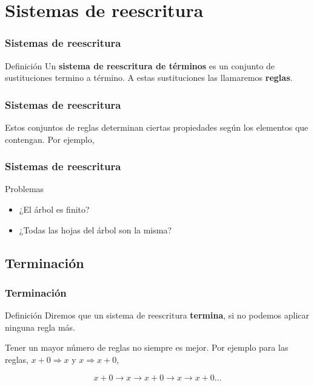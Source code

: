 \documentclass{beamer}
\begin{document}
\section{Sistemas de reescritura}

\begin{frame}
  \frametitle{Sistemas de reescritura}
  \begin{block}{Definición}
    Un \textbf{sistema de reescritura de términos} es un conjunto de
    sustituciones termino a término. A estas sustituciones las
    llamaremos \textbf{reglas}.
  \end{block}
\end{frame}

\begin{frame}
  \frametitle{Sistemas de reescritura}
  \begin{block}{}
    Estos conjuntos de reglas determinan ciertas propiedades según los
    elementos que contengan. Por ejemplo,
    \begin{figure}[h]
      \centering
    \end{figure}
  \end{block}
\end{frame}

\begin{frame}
  \frametitle{Sistemas de reescritura}
  \begin{block}{Problemas}
    \begin{itemize}
    \item ¿El árbol es finito?
    \item ¿Todas las hojas del árbol son la misma?
    \end{itemize}
  \end{block}
\end{frame}

\subsection{Terminación}

\begin{frame}
  \frametitle{Terminación}
  \begin{block}{Definición}
    Diremos que un sistema de reescritura \textbf{termina}, si no podemos
    aplicar ninguna regla más.
  \end{block}

  \begin{block}{}
    Tener un mayor número de reglas no siempre es mejor. Por ejemplo
    para las reglas, $x+0 \Rightarrow x$ y $x \Rightarrow x+0$,

    \[ x + 0 \longrightarrow x \longrightarrow x+0 \longrightarrow x
      \longrightarrow x+0 \dots \]
  \end{block}
\end{frame}
\end{document}

